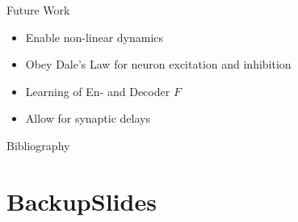 \documentclass[17pt, t, lualatex]{beamer}
\begin{document}
\begin{frame}{Future Work}
	\begin{itemize}
		\setlength\itemsep{1.5em}
		\item Enable non-linear dynamics
		\item Obey Dale's Law for neuron excitation and inhibition
		\item Learning of En- and Decoder $F$
		\item Allow for synaptic delays
	\end{itemize}
\end{frame}


\AtNextBibliography{\small}
\begin{frame}[allowframebreaks]{Bibliography}
	\printbibliography
\end{frame}












\section*{BackupSlides}\insertsectionpage
\end{document}
